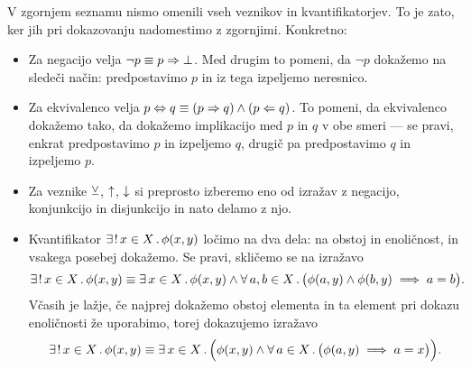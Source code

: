 	V zgornjem seznamu nismo omenili vseh veznikov in kvantifikatorjev. To je zato, ker jih pri dokazovanju nadomestimo z zgornjimi. Konkretno:
	\begin{itemize}
		\item
			Za negacijo velja $\lnot{p} \equiv p \Rightarrow \bot$. Med drugim to pomeni, da $\lnot{p}$ dokažemo na sledeči način: predpostavimo $p$ in iz tega izpeljemo neresnico.
		\item
			Za ekvivalenco velja $p \Leftrightarrow q \equiv (p \Rightarrow q) \land (p \Leftarrow q)$. To pomeni, da ekvivalenco dokažemo tako, da dokažemo implikacijo med $p$ in $q$ v obe smeri --- se pravi, enkrat predpostavimo $p$ in izpeljemo $q$, drugič pa predpostavimo $q$ in izpeljemo $p$.
		\item
			Za veznike $\mathbin{\veebar}$, $\mathbin{\uparrow}$, $\mathbin{\downarrow}$ si preprosto izberemo eno od izražav z negacijo, konjunkcijo in disjunkcijo in nato delamo z njo.
		\item
			Kvantifikator $\xexactlyone{x}[X]{\phi(x, y)}$ ločimo na dva dela: na obstoj in enoličnost, in vsakega posebej dokažemo. Se pravi, skličemo se na izražavo
			\[\xexactlyone{x}[X]{\phi(x, y)} \equiv \xsome{x}[X]{\phi(x, y)} \land \all[1]{a, b}[X]{\phi(a, y) \land \phi(b, y) \implies a = b}.\]
			Včasih je lažje, če najprej dokažemo obstoj elementa in ta element pri dokazu enoličnosti že uporabimo, torej dokazujemo izražavo
			\[\xexactlyone{x}[X]{\phi(x, y)} \equiv \some[2]{x}[X]{\phi(x, y) \land \all[1]{a}[X]{\phi(a, y) \implies a = x}}.\]
	\end{itemize}
	
